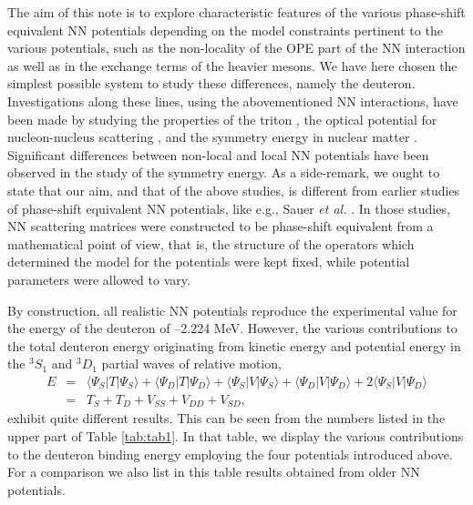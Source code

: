The aim of this note is to explore
characteristic features of the various phase-shift 
equivalent NN potentials depending on the model
constraints pertinent to the various potentials, such as the 
non-locality of the OPE part of the NN interaction as well as in the 
exchange terms of the heavier mesons. We have here chosen the simplest
possible system to study these differences, namely the deuteron.
Investigations along these lines, using the abovementioned
NN interactions, have been
made by studying the properties of the triton \cite{nogga}, the optical potential
for nucleon-nucleus scattering \cite{wep}, and the symmetry energy in nuclear
matter \cite{engv}. Significant differences between non-local and local NN
potentials have been observed in the study of the symmetry energy. 
As a side-remark, we ought to state that our aim, and that of the above
studies,  is different from earlier studies of phase-shift 
equivalent NN potentials, like e.g., Sauer {\it et al.} \cite{sauer,bara,haftel}. 
In those studies,
NN scattering matrices were constructed to be phase-shift equivalent
from a mathematical point of view, that is, the structure of the 
operators which determined the model for the potentials were
kept fixed, while potential parameters were allowed to vary. 

By construction,
all realistic NN potentials reproduce the experimental value for the 
energy of the deuteron of --2.224 MeV. 
However, the various contributions 
to the total deuteron energy 
originating from kinetic energy and potential energy in the
$^3S_1$ and $^3D_1$ partial waves of relative motion,
\begin{eqnarray}
   E & = & \langle \Psi_S \vert T \vert \Psi_S\rangle +  
            \langle \Psi_D \vert T \vert \Psi_D\rangle +
           \langle \Psi_S\vert V \vert \Psi_S\rangle + 
           \langle \Psi_D\vert V \vert \Psi_D\rangle + 2
           \langle \Psi_S\vert V \vert \Psi_D\rangle \nonumber \\
     & = & T_S + T_D + V_{SS} + V_{DD} + V_{SD}, \label{eq:split}
\end{eqnarray}
exhibit quite different results. This can be seen from the numbers listed in 
the upper part of 
Table \ref{tab:tab1}. In that table, we
display the various contributions to the deuteron binding 
energy employing the four
potentials introduced above.  For a comparison we also list in this table
results obtained from older NN potentials. 

